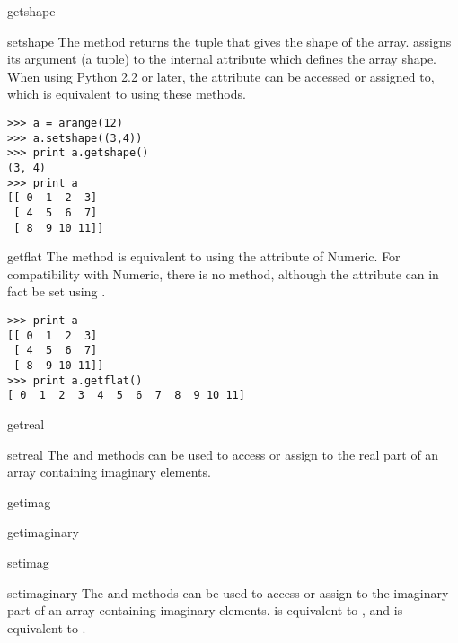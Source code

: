 \begin{methoddesc}[numarray]{getshape}{}
\end{methoddesc}
\begin{methoddesc}[numarray]{setshape}{}
   The  method returns the tuple that gives the shape of the
   array.   assigns its argument (a tuple) to the internal
   attribute which defines the array shape. When using Python 2.2 or later, the
    attribute can be accessed or assigned to, which is equivalent
   to using these methods.
\begin{verbatim}
>>> a = arange(12)
>>> a.setshape((3,4))
>>> print a.getshape()
(3, 4)
>>> print a
[[ 0  1  2  3]
 [ 4  5  6  7]
 [ 8  9 10 11]]
\end{verbatim}
\end{methoddesc}


\begin{methoddesc}[numarray]{getflat}{}
   The  method is equivalent to using the 
   attribute of Numeric. For compatibility with Numeric, there is no
    method, although the attribute can in fact be set using
   .
\begin{verbatim}
>>> print a
[[ 0  1  2  3]
 [ 4  5  6  7]
 [ 8  9 10 11]]
>>> print a.getflat()
[ 0  1  2  3  4  5  6  7  8  9 10 11]
\end{verbatim}
\end{methoddesc}


\begin{methoddesc}[numarray]{getreal}{}
\end{methoddesc}
\begin{methoddesc}[numarray]{setreal}{}
   The  and  methods can be used to access or
   assign to the real part of an array containing imaginary elements.
\end{methoddesc}


\begin{methoddesc}[numarray]{getimag}{}
\end{methoddesc}
\begin{methoddesc}[numarray]{getimaginary}{}
\end{methoddesc}
\begin{methoddesc}[numarray]{setimag}{}
\end{methoddesc}
\begin{methoddesc}[numarray]{setimaginary}{}
   The  and  methods can be used to access or
   assign to the imaginary part of an array containing imaginary elements.
    is equivalent to , and
    is equivalent to .
\end{methoddesc}

